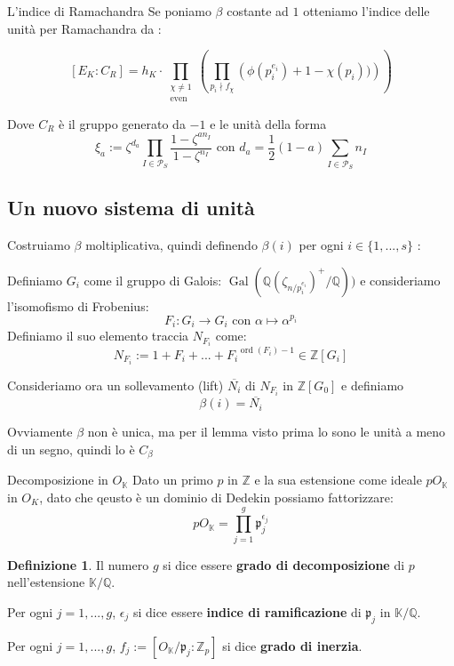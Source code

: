 \documentclass{beamer}
\theoremstyle{plain}
\theoremstyle{remark}
\theoremstyle{definition}
\newtheorem{deff}[teo]{Definizione}
\newcommand{\PS}{\mathcal{P}_S}
\newcommand{\Z}{\mathbb{Z}}
\newcommand{\K}{\mathbb{K}}
\newcommand{\Q}{\mathbb{Q}}
\DeclareMathOperator{\Gal}{Gal}
\DeclareMathOperator{\ord}{ord}
\begin{document}
	\begin{frame}{L'indice di Ramachandra}
		Se poniamo $\beta$ costante ad $ 1 $ otteniamo l'indice delle unità per Ramachandra da \cite{RAM}:
			\begin{alertblock}{}
			\begin{equation}\label{eq:idx_ram}
				[E_K : C_R ] = h_K \cdot  \prod_{ \substack{\chi \neq 1 \\ \text{even}}} \left( \prod_{p_i \nmid f_\chi} \left( \phi (p_i^{e_i})  + 1- \chi (p_i))\right)  \right) 
			\end{equation}
			\end{alertblock}
			Dove $ C_R $ è il gruppo generato da $ -1 $ e le unità della forma
			\[ \xi_a := \zeta ^{d_a } \prod _{I \in \PS} \frac{ 1 - \zeta^{an_I}}{ 1 - \zeta^{n_I}}  \text{ con } d_a =\frac{1}{2}(1-a) \sum_{I \in \PS} n_I\]
	\end{frame}
	
\subsection{Un nuovo sistema di unità}
	
	\begin{frame}
		Costruiamo $\beta$ moltiplicativa, quindi definendo $ \beta (i) $ per ogni $ i \in \{ 1 , ... , s\} $ :

		Definiamo $ G_i $ come il gruppo di Galois: $ \Gal ( \Q(\zeta_{n/p_i^{e_i}})^+ / \Q)) $ e consideriamo l'isomofismo di Frobenius:
		\[ F_i : G_i \to G_i \text{ con }  \alpha \mapsto \alpha ^ {p_i}\] \pause
		 Definiamo il suo elemento traccia $ N_{F_i} $ come:
		 \[ N_{F_i} := 1 + F_i + ... + {F_i}^{\ord (F_i) - 1} \in  \Z [G_i] \] \pause
		 \begin{alertblock}{}
			 Consideriamo ora un sollevamento (lift) $ \overline{N_i} $ di $ N_{F_i} $ in $ \Z[G_0] $ e definiamo
			 \[ \beta (i) =  \overline{N_i} \]
		 \end{alertblock}\pause
		 
		Ovviamente $\beta$ non è unica, ma per il lemma visto prima lo sono le unità a meno di un segno, quindi lo è $ C_\beta $
	\end{frame}

	
	\begin{frame}{Decomposizione in $ O_\K $}
		Dato un primo $ p $ in $ \Z $ e la sua estensione come ideale $ pO_\K $ in $ O_K $, dato che qeusto è un dominio di Dedekin possiamo fattorizzare:
			\begin{equation}\label{eq:fact_p}
				pO_\K = \prod_{j=1}^g \mathfrak{p}_j^{\epsilon _j}
			\end{equation} 
			\pause
			\begin{deff} \label{def:degree}
				Il numero $ g $ si dice essere \textbf{grado di decomposizione} di $ p $ nell'estensione $ \K / \Q $.
				
				Per ogni $ j=1, ..., g $, $ \epsilon _j $ si dice essere \textbf{indice di ramificazione} di $ \mathfrak{p}_j $ in $ \K / \Q $.
				
				Per ogni $ j=1, ..., g $, $ f_j := [O_\K / \mathfrak{p}_j : \Z_p ] $ si dice \textbf{grado di inerzia}.
			\end{deff}
	\end{frame}
	
\end{document}
